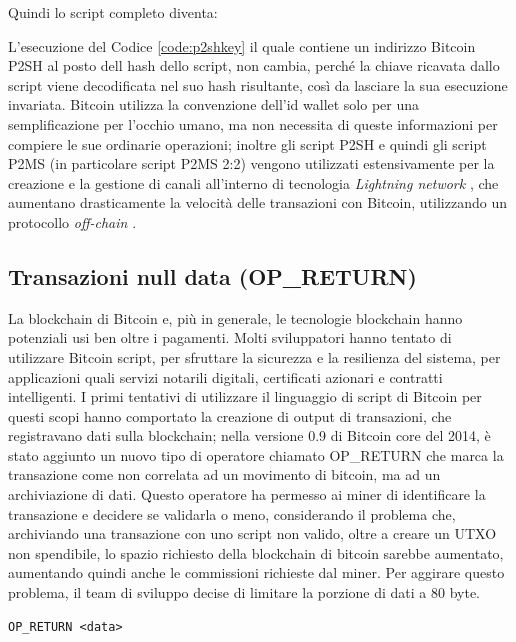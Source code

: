 Quindi lo script completo diventa:



L’esecuzione del Codice \ref{code:p2shkey} il quale contiene un indirizzo Bitcoin P2SH al posto dell hash dello script, non cambia, perché la chiave ricavata dallo script viene decodificata nel suo hash risultante, così da lasciare la sua esecuzione invariata.
Bitcoin utilizza la convenzione dell'id wallet solo per una semplificazione per l'occhio umano, ma non necessita di queste informazioni per compiere le sue ordinarie operazioni; inoltre gli script P2SH e quindi gli script P2MS (in particolare script P2MS 2:2) vengono utilizzati estensivamente per la creazione e la gestione di canali all’interno di tecnologia {\it Lightning network \/}, che aumentano drasticamente la velocità delle transazioni con Bitcoin, utilizzando un protocollo {\it off-chain \/}.

\subsection{Transazioni null data (OP\_RETURN)}
La blockchain di Bitcoin e, più in generale, le tecnologie blockchain hanno potenziali usi ben oltre i pagamenti. Molti sviluppatori hanno tentato di utilizzare Bitcoin script, per sfruttare la sicurezza e la resilienza del sistema, per applicazioni quali servizi notarili digitali, certificati azionari e contratti intelligenti. I primi tentativi di utilizzare il linguaggio di script di Bitcoin per questi scopi hanno comportato la creazione di output di transazioni, che registravano dati sulla blockchain; nella versione 0.9 di Bitcoin core del 2014, è stato aggiunto un nuovo tipo di operatore chiamato OP\_RETURN che marca la transazione come non correlata ad un movimento di bitcoin, ma ad un archiviazione di dati. Questo operatore ha permesso ai miner di identificare la transazione e decidere se validarla o meno, considerando il problema che, archiviando una transazione con uno script non valido, oltre a creare un UTXO non spendibile, lo spazio richiesto della blockchain di bitcoin sarebbe aumentato, aumentando quindi anche le commissioni richieste dal miner.
Per aggirare questo problema, il team di sviluppo decise di limitare la porzione di dati a 80 byte.

\begin{lstlisting}[language=bitcoinscript, label={code:nulldata}, caption={Uso dell'operatore OP\_RETURN.}]
OP_RETURN <data>
\end{lstlisting}


